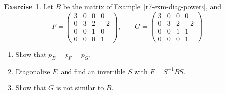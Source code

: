 \documentclass[12pt]{article}
\theoremstyle{definition}
\newtheorem{exercise}{Exercise}
\begin{document}
\begin{exercise}\label{r7-ex-similar}
Let \(B\) be the matrix of Example~\ref{r7-exm-diag-powers}, and
\[
F=\begin{pmatrix}3&0&0&0\\0&3&2&-2\\0&0&1&0\\0&0&0&1\end{pmatrix},\qquad
G=\begin{pmatrix}3&0&0&0\\0&3&2&-2\\0&0&1&1\\0&0&0&1\end{pmatrix}
\]
\begin{enumerate}
\item Show that \(p_B=p_F=p_G\).
\item Diagonalize \(F\), and find an invertible \(S\) with \(F=S^{-1}BS\).
\item Show that \(G\) is not similar to \(B\).
\end{enumerate}
\end{exercise}
\end{document}
